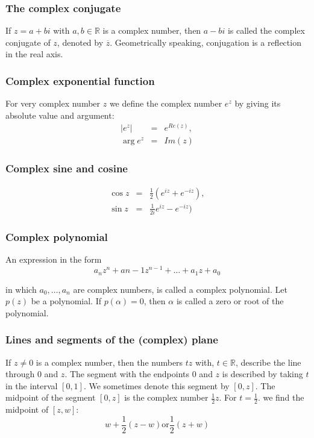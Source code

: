 \documentclass{article}
\begin{document}
			\subsubsection{The complex conjugate}
			If $z = a+bi$ with $a,b \in \mathbb{R}$ is a complex number, then $a-bi$ is called the complex conjugate of $z$, denoted by $\overline{z}$. Geometrically speaking, conjugation is a reflection in the real axis.
			
			\subsubsection{Complex exponential function}
			For very complex number $z$ we define the complex number $e^z$ by giving its absolute value and argument:
			\begin{eqnarray*}
				|e^z| &=& e^{Re(z)}, \\
				\arg{e^z} &=& Im(z)
			\end{eqnarray*}
		
			\subsubsection{Complex sine and cosine}
			\begin{eqnarray*}
				\cos{z} &=& \frac{1}{2}(e^{iz} + e^{-iz}), \\
				\sin{z} &=& \frac{1}{2i}e^{iz} - e^{-iz})
			\end{eqnarray*}
		
			\subsubsection{Complex polynomial}
			An expression in the form
			\begin{equation*}
				a_nz^n + a{n-1}z^{n-1} + \dots + a_1z+a_0
			\end{equation*}
			
			in which $a_0,\dots,a_n$ are complex numbers, is called a complex polynomial. Let $p(z)$ be a polynomial. If $p(\alpha) = 0$, then $\alpha$ is called a zero or root of the polynomial.
			
			\subsubsection{Lines and segments of the (complex) plane}
			If $z \neq 0$ is a complex number, then the numbers $tz$ with, $t \in \mathbb{R}$, describe the line through $0$ and $z$. The segment with the endpoints $0$ and $z$ is described by taking $t$ in the interval $[0,1]$. We sometimes denote this segment by $[0,z]$. The midpoint of the segment $[0,z]$ is the complex number $\frac{1}{2}z$. For $t = \frac{1}{2}$. we find the midpoint of $[z,w]$:
			\begin{equation*}
				w + \frac{1}{2}(z-w) \text{or} \frac{1}{2}(z+w)
			\end{equation*}
			
\end{document}
